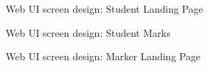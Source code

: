 \begin{figure}[H]
\centering	
{}
\caption{Web UI screen design: Student Landing Page}
\end{figure}

\begin{figure}[H]
\centering	
{}
\caption{Web UI screen design: Student Marks}
\end{figure}

\begin{figure}[H]
\centering	
{}
\caption{Web UI screen design: Marker Landing Page}
\end{figure}

